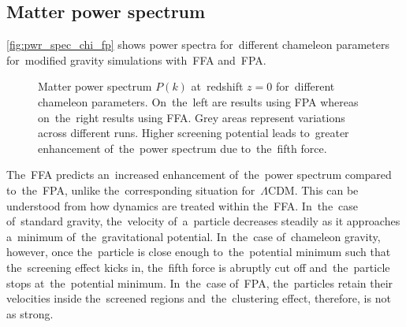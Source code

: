 \subsection{Matter power spectrum}
\autoref{fig:pwr_spec_chi_fp} shows power spectra for~different chameleon parameters for~modified gravity simulations with~FFA and~FPA.
\begin{figure*}[bt]
	\begin{adjustwidth}{-1cm}{-1cm}
	\centering
		\begin{subfigure}{1.2\textwidth}
		\end{subfigure}
		\begin{subfigure}{0.5\textwidth}
		\end{subfigure}%
		\begin{subfigure}{0.5\textwidth}
		\end{subfigure}
		\begin{subfigure}{0.5\textwidth}
		\end{subfigure}%
		\begin{subfigure}{0.5\textwidth}
		\end{subfigure}
	\end{adjustwidth}
    \caption{Matter power spectrum $P(k)$ at~redshift $z=0$ for~different chameleon parameters. On~the~left are results using FPA whereas on~the~right results using FFA. Grey areas represent variations across different runs. Higher screening potential leads to~greater enhancement of~the~power spectrum due to~the~fifth force.}
    \label{fig:pwr_spec_chi_fp}
\end{figure*}

The~FFA predicts an~increased enhancement of~the~power spectrum compared to~the~FPA, unlike the~corresponding situation for~$\Lambda$CDM. This can be understood from how dynamics are treated within the~FFA. In~the~case of~standard gravity, the~velocity of~a~particle decreases steadily as it approaches a~minimum of~the~gravitational potential. In~the~case of~chameleon gravity, however, once the~particle is close enough to~the~potential minimum such that the~screening effect kicks in, the~fifth force is abruptly cut off and~the~particle stops at~the~potential minimum. In~the~case of~FPA, the~particles retain their velocities inside the~screened regions and~the~clustering effect, therefore, is not as strong.

